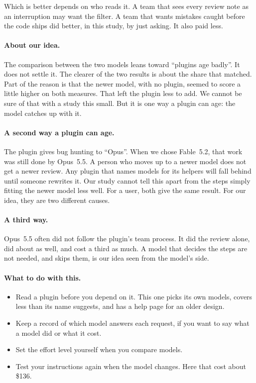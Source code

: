 \documentclass[11pt]{article}
\begin{document}
Which is better depends on who reads it. A team that sees every review note as an interruption may want the filter. A team that wants mistakes caught before the code ships did better, in this study, by just asking. It also paid less.

\paragraph{About our idea.} The comparison between the two models leans toward ``plugins age badly''. It does not settle it. The clearer of the two results is about the share that matched. Part of the reason is that the newer model, with no plugin, seemed to score a little higher on both measures. That left the plugin less to add. We cannot be sure of that with a study this small. But it is one way a plugin can age: the model catches up with it.

\paragraph{A second way a plugin can age.} The plugin gives bug hunting to ``Opus''. When we chose Fable~5.2, that work was still done by Opus~5.5. A person who moves up to a newer model does not get a newer review. Any plugin that names models for its helpers will fall behind until someone rewrites it. Our study cannot tell this apart from the steps simply fitting the newer model less well. For a user, both give the same result. For our idea, they are two different causes.

\paragraph{A third way.} Opus~5.5 often did not follow the plugin's team process. It did the review alone, did about as well, and cost a third as much. A model that decides the steps are not needed, and skips them, is our idea seen from the model's side.

\paragraph{What to do with this.}
\begin{itemize}
\item Read a plugin before you depend on it. This one picks its own models, covers less than its name suggests, and has a help page for an older design.
\item Keep a record of which model answers each request, if you want to say what a model did or what it cost.
\item Set the effort level yourself when you compare models.
\item Test your instructions again when the model changes. Here that cost about \$136.
\end{itemize}
\end{document}
